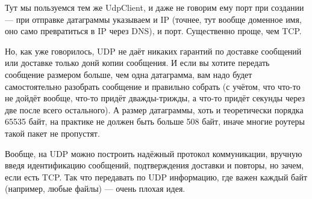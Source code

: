 \documentclass[a5paper]{article}
\begin{document}
Тут мы пользуемся тем же UdpClient, и даже не говорим ему порт при создании --- при отправке датаграммы указываем и IP (точнее, тут вообще доменное имя, оно само превратиться в IP через DNS), и порт. Существенно проще, чем TCP.

Но, как уже говорилось, UDP не даёт никаких гарантий по доставке сообщений или доставке только донй копии сообщения. И если вы хотите передать сообщение размером больше, чем одна датаграмма, вам надо будет самостоятельно разобрать сообщение и правильно собрать (с учётом, что что-то не дойдёт вообще, что-то придёт дважды-трижды, а что-то придёт секунды через две после всего остального). А размер датаграммы, хоть и теоретически порядка 65535 байт, на практике не должен быть больше 508 байт, иначе многие роутеры такой пакет не пропустят. 

Вообще, на UDP можно построить надёжный протокол коммуникации, вручную введя идентификацию сообщений, подтверждения доставки и повторы, но зачем, если есть TCP. Так что передавать по UDP информацию, где важен каждый байт (например, любые файлы) --- очень плохая идея.
\end{document}
